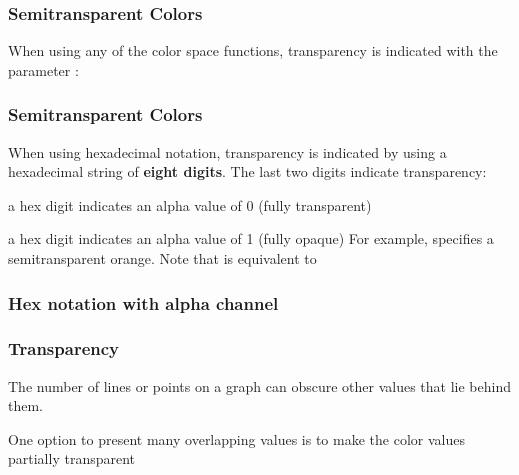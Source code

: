 \documentclass[12pt]{beamer}\usepackage[]{graphicx}\usepackage[]{color}
\begin{document}

\begin{frame}
\frametitle{Semitransparent Colors}

When using any of the color space functions, transparency is indicated with the parameter {\hilit {}}:
\bi
 \item {}
 \item {}
 \item {}
\ei
\eb

\end{frame}


\begin{frame}
\frametitle{Semitransparent Colors}

When using hexadecimal notation, transparency is indicated by using a hexadecimal string of \textbf{eight digits}. The last two digits indicate transparency:
\bi
 \item a hex digit  indicates an alpha value of 0 (fully transparent)
 \item a hex digit  indicates an alpha value of 1 (fully opaque)
\ei
For example,  specifies a semitransparent orange. Note that  is equivalent to 
\eb

\end{frame}


\begin{frame}[fragile]
\frametitle{Hex notation with alpha channel}
\begin{center}
\end{center}
\end{frame}


\begin{frame}
\frametitle{Transparency}

\bi
 \item The number of lines or points on a graph can obscure other values that lie behind them.
 \item One option to present many overlapping values is to make the color values partially transparent
\ei
\eb

\end{frame}
\end{document}
